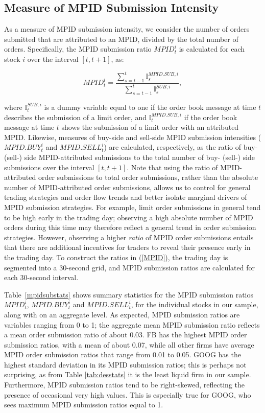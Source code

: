 \documentclass{article}
\begin{document}
\subsection{Measure of MPID Submission Intensity}\label{mpidsub}

As a measure of MPID submission intensity, we consider the number of orders submitted that are attributed to an MPID, divided by the total number of orders. Specifically, the MPID submission ratio $MPID_t^i$ is calculated for each stock $i$ over the interval $[t,t+1]$, as:

\begin{equation}
MPID_t^i=\frac{ \sum_{s=t-1}^{t} \mathbb{I}_s^{MPID.SUB,i} } {\sum_{s=t-1}^{t} \mathbb{I}_s^{SUB,i}}, \label{MPID}
\end{equation}

\noindent where $\mathbb{I}_t^{SUB,i}$ is a dummy variable equal to one if the order book message at time $t$ describes the submission of a limit order, and $\mathbb{I}_t^{MPID.SUB,i}$ if the order book message at time $t$ shows the submission of a limit order with an attributed MPID. Likewise, measures of buy-side and sell-side MPID submission intensities ($MPID.BUY_t^{i}$ and $MPID.SELL_t^{i}$) are calculated, respectively, as the ratio of buy- (sell-) side MPID-attributed submissions to the total number of buy- (sell-) side submissions over the interval $[t,t+1]$. Note that using the ratio of MPID-attributed order submissions to total order submissions, rather than the absolute number of MPID-attributed order submissions, allows us to control for general trading strategies and order flow trends and better isolate marginal drivers of MPID submission strategies. For example, limit order submissions in general tend to be high early in the trading day; observing a high absolute number of MPID orders during this time may therefore reflect a general trend in order submission strategies. However, observing a higher \emph{ratio} of MPID order submissions entails that there are additional incentives for traders to reveal their presence early in the trading day. To construct the ratios in (\ref{MPID}), the trading day is segmented into a 30-second grid, and MPID submission ratios are calculated for each 30-second interval.

Table~\ref{mpidsubstats} shows summary statistics for the MPID submission ratios $MPID_t^i$, $MPID.BUY_t^{i}$ and $MPID.SELL_t^{i}$, for the individual stocks in our sample, along with on an aggregate level. As expected, MPID submission ratios are variables ranging from 0 to 1; the aggregate mean MPID submission ratio reflects a mean order submission ratio of about 0.03. FB has the highest MPID order submission ratios, with a mean of about 0.07, while all other firms have average MPID order submission ratios that range from 0.01 to 0.05. GOOG has the highest standard deviation in its MPID submission ratios; this is perhaps not surprising, as from Table \ref{tab:desstats} it is the least liquid firm in our sample. Furthermore, MPID submission ratios tend to be right-skewed, reflecting the presence of occasional very high values. This is especially true for GOOG, who sees maximum MPID submission ratios equal to 1.
\end{document}
